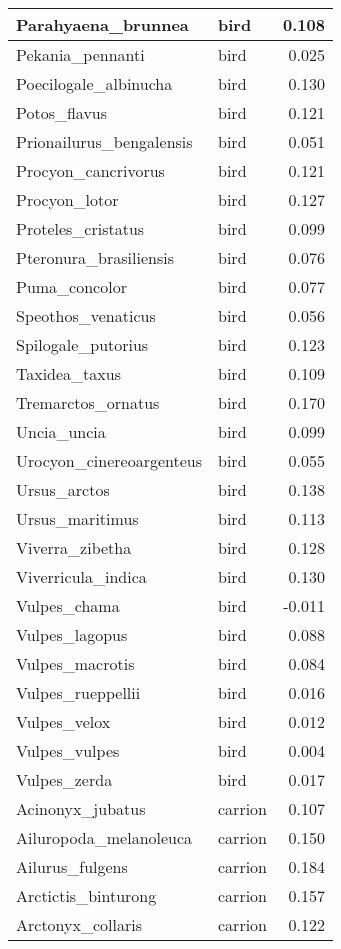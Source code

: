 \begin{table}
\begin{tabular}[t]{l|l|r}
\hline
Parahyaena\_brunnea & bird & 0.108\\
\hline
Pekania\_pennanti & bird & 0.025\\
\hline
Poecilogale\_albinucha & bird & 0.130\\
\hline
Potos\_flavus & bird & 0.121\\
\hline
Prionailurus\_bengalensis & bird & 0.051\\
\hline
Procyon\_cancrivorus & bird & 0.121\\
\hline
Procyon\_lotor & bird & 0.127\\
\hline
Proteles\_cristatus & bird & 0.099\\
\hline
Pteronura\_brasiliensis & bird & 0.076\\
\hline
Puma\_concolor & bird & 0.077\\
\hline
Speothos\_venaticus & bird & 0.056\\
\hline
Spilogale\_putorius & bird & 0.123\\
\hline
Taxidea\_taxus & bird & 0.109\\
\hline
Tremarctos\_ornatus & bird & 0.170\\
\hline
Uncia\_uncia & bird & 0.099\\
\hline
Urocyon\_cinereoargenteus & bird & 0.055\\
\hline
Ursus\_arctos & bird & 0.138\\
\hline
Ursus\_maritimus & bird & 0.113\\
\hline
Viverra\_zibetha & bird & 0.128\\
\hline
Viverricula\_indica & bird & 0.130\\
\hline
Vulpes\_chama & bird & -0.011\\
\hline
Vulpes\_lagopus & bird & 0.088\\
\hline
Vulpes\_macrotis & bird & 0.084\\
\hline
Vulpes\_rueppellii & bird & 0.016\\
\hline
Vulpes\_velox & bird & 0.012\\
\hline
Vulpes\_vulpes & bird & 0.004\\
\hline
Vulpes\_zerda & bird & 0.017\\
\hline
Acinonyx\_jubatus & carrion & 0.107\\
\hline
Ailuropoda\_melanoleuca & carrion & 0.150\\
\hline
Ailurus\_fulgens & carrion & 0.184\\
\hline
Arctictis\_binturong & carrion & 0.157\\
\hline
Arctonyx\_collaris & carrion & 0.122\\

\end{tabular}
\end{table}
